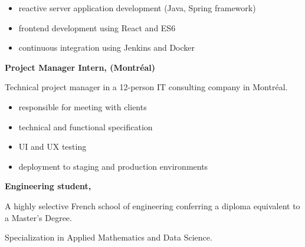 \documentclass{cv}
\begin{document}
\begin{minipage}[t]{.65\textwidth}
\begin{expbox}[title={dec. 2016, \faicon{clock-o} 3 years}]
\begin{minipage}[t]{0.8\textwidth}
	\begin{itemize}
		\item reactive server application development (Java, Spring framework)
		\item frontend development using React and ES6
		\item continuous integration using Jenkins and Docker
		\end{itemize}
	\end{minipage}

\end{expbox}

\begin{expbox}[title={may 2018, \faicon{clock-o} 4 months}]

	\begin{minipage}[t]{\logoboxwidth}%
	\centering
	\end{minipage}
	\begin{minipage}[t]{0.8\textwidth}

	\textbf{Project Manager Intern, \adfab{} (Montréal)}\smallskip

	Technical project manager in a 12-person IT consulting company in Montréal.

	\begin{itemize}
		\item responsible for meeting with clients
		\item technical and functional specification
		\item UI and UX testing
		\item deployment to staging and production environments
		\end{itemize}
	\end{minipage}

\end{expbox}

\begin{expbox}[title={2016 -- 2019}]

	\begin{minipage}[t]{\logoboxwidth}%
	\centering
	\end{minipage}
	\begin{minipage}[t]{0.8\textwidth}

	\textbf{Engineering student, \ecn{}}\smallskip

	A highly selective French school of engineering conferring a diploma equivalent to a Master’s Degree. 

	Specialization in Applied Mathematics and Data Science.
	\end{minipage}

\end{expbox}

\end{minipage}
\end{document}

